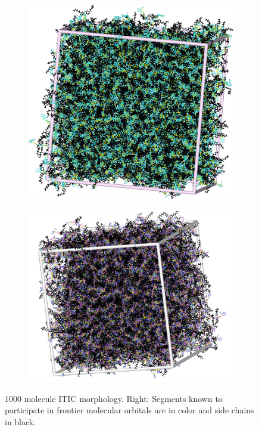 \begin{figure}[]
\centering
\begin{subfigure}{.5\textwidth}
    \includegraphics[width=\textwidth]{figures/ITIC-blackedout-unwrapped-allatom.png}
\end{subfigure}%
\begin{subfigure}{.5\textwidth}
    \includegraphics[width=\textwidth]{figures/ITIC-blackedout-unwrapped.png}
\end{subfigure}
    \caption[short]{1000 molecule ITIC morphology. Right: Segments known to participate in frontier
    molecular orbitals are in color and side chains in black.}
\label{ITIC}
\end{figure}



